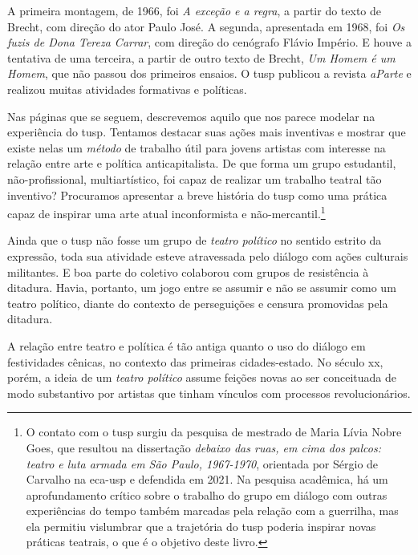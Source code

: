A primeira montagem, de 1966, foi {\it A exceção e a regra}, a partir do
texto de Brecht, com direção do ator Paulo José. A segunda, apresentada
em 1968, foi {\it Os fuzis de Dona Tereza Carrar}, com direção do
cenógrafo Flávio Império. E houve a tentativa de uma terceira, a partir
de outro texto de Brecht, {\it Um Homem é um Homem}, que não passou dos
primeiros ensaios. O {\sc tusp} publicou a revista {\it aParte} e realizou
muitas atividades formativas e políticas.

Nas páginas que se seguem, descrevemos aquilo que nos parece modelar na
experiência do {\sc tusp}. Tentamos destacar suas ações mais inventivas e
mostrar que existe nelas um {\it método} de trabalho útil para jovens
artistas com interesse na relação entre arte e política anticapitalista.
De que forma um grupo estudantil, não-profissional, multiartístico, foi
capaz de realizar um trabalho teatral tão inventivo? Procuramos
apresentar a breve história do {\sc tusp} como uma prática capaz de inspirar
uma arte atual inconformista e não-mercantil.\footnote{O contato com o
  {\sc tusp} surgiu da pesquisa de mestrado de Maria Lívia Nobre Goes, que
  resultou na dissertação {\it debaixo das ruas, em cima dos palcos:
  teatro e luta armada em São Paulo, 1967-1970}, orientada por Sérgio de
  Carvalho na {\sc eca-usp} e defendida em 2021. Na pesquisa acadêmica, há um
  aprofundamento crítico sobre o trabalho do grupo em diálogo com outras
  experiências do tempo também marcadas pela relação com a guerrilha,
  mas ela permitiu vislumbrar que a trajetória do {\sc tusp} poderia inspirar
  novas práticas teatrais, o que é o objetivo deste livro.}

\subject{Políticas do teatro}

Ainda que o {\sc tusp} não fosse um grupo de {\it teatro político} no sentido
estrito da expressão, toda sua atividade esteve atravessada pelo diálogo
com ações culturais militantes. E boa parte do coletivo colaborou com
grupos de resistência à ditadura. Havia, portanto, um jogo entre se
assumir e não se assumir como um teatro político, diante do contexto de
perseguições e censura promovidas pela ditadura.

A relação entre teatro e política é tão antiga quanto o uso do diálogo
em festividades cênicas, no contexto das primeiras cidades-estado. No
século {\sc xx}, porém, a ideia de um {\it teatro político} assume feições
novas ao ser conceituada de modo substantivo por artistas que tinham
vínculos com processos revolucionários.

